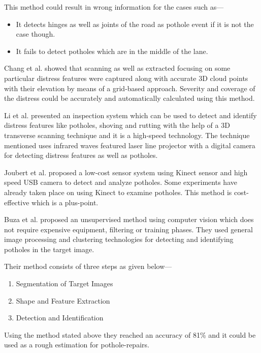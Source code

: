 \documentclass[conference]{IEEEtran}
\begin{document}
This method could result in wrong information for the cases such as---
\begin{itemize}
  \item {It detects hinges as well as joints of the road\cite{kim14} as pothole event if it is not the case though.}
        \item{It fails to detect potholes which are in the middle of the lane.}
\end{itemize}
    
Chang et al. showed that scanning as well as extracted focusing on some particular distress features were captured along with accurate 3D cloud points with their elevation by means of a grid-based approach\cite{chang05}. Severity and coverage of the distress could be accurately and automatically calculated using this method\cite{chang05,kim14}.
    
Li et al. presented an inspection system\cite{li09} which can be used to detect and identify distress features like potholes, shoving and rutting with the help of a 3D transverse scanning technique\cite{li09} and it is a high-speed technology. The technique mentioned uses infrared waves featured laser line projector with a digital camera for detecting distress features as well as potholes\cite{li09}. 
            
Joubert et al.\cite{buza2013stereo} proposed a low-cost sensor system using Kinect sensor and high speed USB camera\cite{buza2013stereo} to detect and analyze potholes. Some experiments have already taken place on using Kinect to examine potholes. This method is cost-effective which is a plus-point.
            
Buza et al.\cite{buza2013stereo} proposed an unsupervised method using computer vision which does not require expensive equipment, filtering or training phases\cite{buza2013stereo,ryu2015image}. They used general image processing and clustering technologies for detecting and identifying potholes in the target image\cite{kim14}.
    
Their method consists of three steps as given below---
\begin{enumerate}
  \item {Segmentation of Target Images}
  \item {Shape and Feature Extraction}
  \item {Detection and Identification}
\end{enumerate}
Using the method stated above they reached an accuracy of 81\%\cite{kim14} and it could be used as a rough estimation for pothole-repairs.
    
\end{document}
